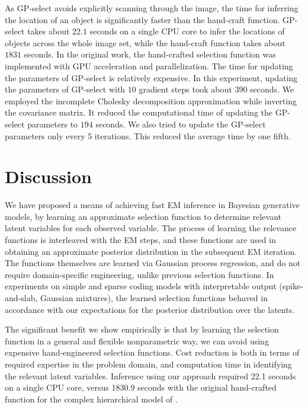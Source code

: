 As GP-select avoids explicitly scanning through the image, the time for inferring the location of an object is significantly faster than the hand-craft function. GP-select takes about $22.1$ seconds on a single CPU core to infer the locations of objects across the whole image set, while the hand-craft function takes about $1831$ seconds. In the original work, the hand-crafted selection function was implemented with GPU acceleration and parallelization. The time for updating the parameters of GP-select is relatively expensive. In this experiment, updating the parameters of GP-select with $10$ gradient steps took about $390$ seconds. We employed the incomplete Cholesky decomposition approximation while inverting the covariance matrix. It reduced the computational time of updating the GP-select parameters to $194$ seconds. We also tried to update the GP-select parameters only every 5 iterations. This reduced the average time by one fifth.


\section{Discussion}
%
We have proposed a means of achieving fast EM inference in Bayesian generative models, by
learning an approximate selection function to determine relevant latent variables
for each observed variable. The process of learning the relevance functions
is interleaved with the EM steps, and these functions
are used in obtaining an approximate posterior distribution in the subsequent EM iteration.
The functions themselves are learned via Gaussian process regression,
and do not require domain-specific engineering, unlike previous selection functions.
In experiments on simple and sparse coding models with interpretable output (spike-and-slab, Gaussian mixtures),
the learned selection functions behaved in accordance with our expectations for the posterior
distribution over the latents.  

The significant benefit we show empirically is that by learning the selection function in a general and flexible nonparametric way, we can avoid using expensive hand-engineered selection functions.
Cost reduction is both in terms of required expertise in the problem domain, and computation time in identifying the relevant latent variables.
Inference using our approach required 22.1 seconds on a single CPU core, versus  1830.9 seconds with the original hand-crafted function 
for the complex hierarchical model of \citep{DaiLucke2014}.

